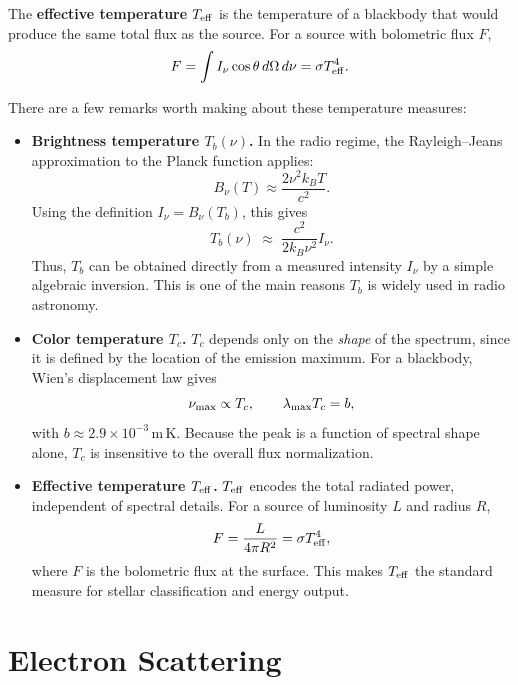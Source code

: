 \vspace{0.3cm}
\begin{definition}
The \textbf{effective temperature} $T_{\rm eff}$ is the temperature of a blackbody that would produce the same total flux as the source.  
For a source with bolometric flux $F$,
\[
F = \int I_\nu \cos\theta \, d\Omega \, d\nu = \sigma T_{\rm eff}^4.
\]
\end{definition}
\par
There are a few remarks worth making about these temperature measures:
\vspace{0.2cm}
\begin{itemize}
    \item \textbf{Brightness temperature $T_b(\nu)$.}  
    In the radio regime, the Rayleigh–Jeans approximation to the Planck function applies:
    \[
    B_\nu(T) \approx \frac{2\nu^2 k_B T}{c^2}.
    \]
    Using the definition $I_\nu = B_\nu(T_b)$, this gives
    \[
    T_b(\nu) \;\approx\; \frac{c^2}{2k_B \nu^2} I_\nu.
    \]
    Thus, $T_b$ can be obtained directly from a measured intensity $I_\nu$ by a simple algebraic inversion.  
    This is one of the main reasons $T_b$ is widely used in radio astronomy.
    
    \item \textbf{Color temperature $T_c$.}  
    $T_c$ depends only on the \emph{shape} of the spectrum, since it is defined by the location of the emission maximum.  
    For a blackbody, Wien’s displacement law gives
    \[
    \nu_{\rm max} \propto T_c, \qquad \lambda_{\rm max} T_c = b,
    \]
    with $b \approx 2.9 \times 10^{-3}\,\mathrm{m \, K}$.  
    Because the peak is a function of spectral shape alone, $T_c$ is insensitive to the overall flux normalization.

    \item \textbf{Effective temperature $T_{\rm eff}$.}  
    $T_{\rm eff}$ encodes the total radiated power, independent of spectral details.  
    For a source of luminosity $L$ and radius $R$,
    \[
    F = \frac{L}{4\pi R^2} = \sigma T_{\rm eff}^4,
    \]
    where $F$ is the bolometric flux at the surface.  
    This makes $T_{\rm eff}$ the standard measure for stellar classification and energy output.
\end{itemize}

\section{Electron Scattering}

